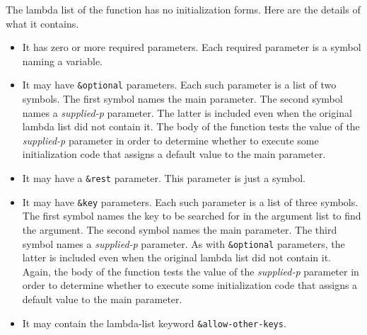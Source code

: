 The lambda list of the function has no initialization forms.  Here are
the details of what it contains. 

\begin{itemize}
\item It has zero or more required parameters.  Each required
  parameter is a symbol naming a variable.  
\item It may have \texttt{\&optional} parameters.  Each such parameter
  is a list of two symbols.  The first symbol names the main parameter.
  The second symbol names a \emph{supplied-p} parameter.  The latter
  is included even when the original lambda list did not contain it.
  The body of the function tests the value of the \emph{supplied-p}
  parameter in order to determine whether to execute some
  initialization code that assigns a default value to the main
  parameter. 
\item It may have a \texttt{\&rest} parameter.  This parameter is just
  a symbol.
\item It may have \texttt{\&key} parameters.  Each such parameter is a
  list of three symbols.  The first symbol names the key to be
  searched for in the argument list to find the argument.  The second
  symbol names the main parameter.  The third symbol names a
  \emph{supplied-p} parameter.  As with \texttt{\&optional}
  parameters, the latter is included even when the original lambda
  list did not contain it.  Again, the body of the function tests the
  value of the \emph{supplied-p} parameter in order to determine
  whether to execute some initialization code that assigns a default
  value to the main parameter.
\item It may contain the lambda-list keyword
  \texttt{\&allow-other-keys}. 
\end{itemize}

